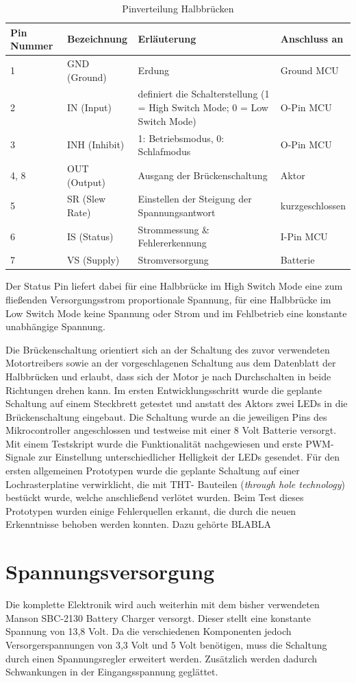 \begin{table}[h]
	\centering
		\begin{tabular}{l|p{}|p{8cm}|p{3cm}}
			\textbf{Pin Nummer} & \textbf{Bezeichnung} & \textbf{Erläuterung} & \textbf{Anschluss an} \\ \hline
			1 & GND (Ground) & Erdung & Ground MCU \\
			2 & IN (Input) & definiert die Schalterstellung (1 = High Switch Mode; 0 = Low Switch Mode) & O-Pin MCU \\
			3 & INH (Inhibit) & 1: Betriebsmodus, 0: Schlafmodus & O-Pin MCU \\
			4, 8 & OUT (Output) & Ausgang der Brückenschaltung & Aktor \\
			5 & SR (Slew Rate) & Einstellen der Steigung der Spannungsantwort & kurzgeschlossen \\
			6 & IS (Status) & Strommessung \& Fehlererkennung & I-Pin MCU\\
			7 & VS (Supply) & Stromversorgung & Batterie\\
		\end{tabular}
	\caption{Pinverteilung Halbbrücken}
	\label{tab:Pinverteilung}
\end{table}
Der Status Pin liefert dabei für eine Halbbrücke im High Switch Mode eine zum fließenden Versorgungsstrom proportionale Spannung, für eine Halbbrücke im Low Switch Mode keine Spannung oder Strom und im Fehlbetrieb eine konstante unabhängige Spannung.


Die Brückenschaltung orientiert sich an der Schaltung des zuvor verwendeten Motortreibers sowie an der vorgeschlagenen Schaltung aus dem Datenblatt der Halbbrücken und erlaubt, dass sich der Motor je nach Durchschalten in beide Richtungen drehen kann.
Im ersten Entwicklungsschritt wurde die geplante Schaltung auf einem Steckbrett getestet und anstatt des Aktors zwei LEDs in die Brückenschaltung eingebaut. Die Schaltung wurde an die jeweiligen Pins des Mikrocontroller angeschlossen und testweise mit einer 8 Volt Batterie versorgt. Mit einem Testskript wurde die Funktionalität nachgewiesen und erste PWM-Signale zur Einstellung unterschiedlicher Helligkeit der LEDs gesendet.
Für den ersten allgemeinen Prototypen wurde die geplante Schaltung auf einer Lochrasterplatine verwirklicht, die mit THT- Bauteilen (\textit{through hole technology}) bestückt wurde, welche anschließend verlötet wurden.  
Beim Test dieses Prototypen wurden einige Fehlerquellen erkannt, die durch die neuen Erkenntnisse behoben werden konnten. Dazu gehörte BLABLA

\section{Spannungsversorgung}
Die komplette Elektronik wird auch weiterhin mit dem bisher verwendeten Manson SBC-2130 Battery Charger versorgt. Dieser stellt eine konstante Spannung von 13,8 Volt. Da die verschiedenen Komponenten jedoch Versorgerspannungen von 3,3 Volt und 5 Volt benötigen, muss die Schaltung durch einen Spannungsregler erweitert werden. Zusätzlich werden dadurch Schwankungen in der Eingangsspannung geglättet. 